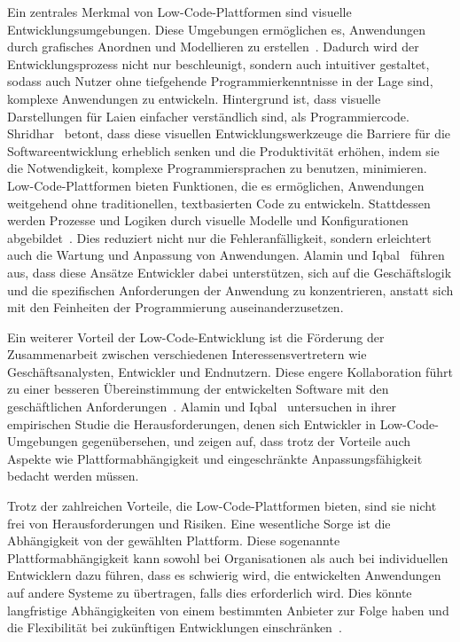 Ein zentrales Merkmal von Low-Code-Plattformen sind visuelle Entwicklungsumgebungen. Diese Umgebungen ermöglichen 
es, Anwendungen durch grafisches Anordnen und Modellieren zu erstellen~\cite{Bock_2021}. Dadurch wird 
der Entwicklungsprozess nicht nur beschleunigt, sondern auch intuitiver gestaltet, sodass auch Nutzer ohne 
tiefgehende Programmierkenntnisse in der Lage sind, komplexe Anwendungen zu entwickeln. Hintergrund ist, dass 
visuelle Darstellungen für Laien einfacher verständlich sind, als Programmiercode. Shridhar~\cite{Shridhar_2021} betont, 
dass diese visuellen Entwicklungswerkzeuge die Barriere für die Softwareentwicklung erheblich senken und die 
Produktivität erhöhen, indem sie die Notwendigkeit, komplexe Programmiersprachen zu benutzen, minimieren.
Low-Code-Plattformen bieten Funktionen, die es ermöglichen, Anwendungen weitgehend ohne traditionellen, 
textbasierten Code zu entwickeln. Stattdessen werden Prozesse und Logiken durch visuelle Modelle und 
Konfigurationen abgebildet~\cite{Bock_2021}. Dies reduziert nicht nur die Fehleranfälligkeit, sondern 
erleichtert auch die Wartung und Anpassung von Anwendungen. Alamin und Iqbal~\cite{Alamin_2021} 
führen aus, dass diese Ansätze Entwickler dabei unterstützen, sich auf die Geschäftslogik und die spezifischen Anforderungen 
der Anwendung zu konzentrieren, anstatt sich mit den Feinheiten der Programmierung auseinanderzusetzen.

Ein weiterer Vorteil der Low-Code-Entwicklung ist die Förderung der Zusammenarbeit zwischen verschiedenen 
Interessensvertretern wie Geschäftsanalysten, Entwickler und Endnutzern. Diese engere Kollaboration führt zu 
einer besseren Übereinstimmung der entwickelten Software mit den geschäftlichen Anforderungen~\cite{Shridhar_2021}. 
Alamin und Iqbal~\cite{Alamin_2021} untersuchen in ihrer empirischen 
Studie die Herausforderungen, denen sich Entwickler in Low-Code-Umgebungen gegenübersehen, und zeigen auf, dass trotz 
der Vorteile auch Aspekte wie Plattformabhängigkeit und eingeschränkte Anpassungsfähigkeit bedacht werden müssen.

Trotz der zahlreichen Vorteile, die Low-Code-Plattformen bieten, sind sie nicht frei von Herausforderungen und Risiken. 
Eine wesentliche Sorge ist die Abhängigkeit von der gewählten Plattform. Diese sogenannte Plattformabhängigkeit kann 
sowohl bei Organisationen als auch bei individuellen Entwicklern dazu führen, dass es schwierig wird, die entwickelten 
Anwendungen auf andere Systeme zu übertragen, falls dies erforderlich wird. Dies könnte langfristige Abhängigkeiten 
von einem bestimmten Anbieter zur Folge haben und die Flexibilität bei zukünftigen Entwicklungen einschränken~\cite{Alamin_2021}. 

